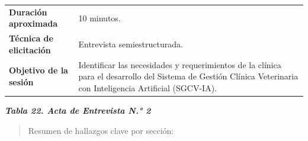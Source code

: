 \documentclass[
]{article}
\begin{document}
{\begin{longtable}[]{|
  >{\raggedright\arraybackslash}p{}|
  >{\raggedright\arraybackslash}p{}|}
\begin{minipage}[t]{\linewidth}
\end{minipage} \\
\hline
\textbf{Duración} \textbf{aproximada} & \begin{minipage}[t]{\linewidth}\raggedright
10 minutos.
\end{minipage} \\
\hline
\textbf{Técnica de} \textbf{elicitación} & \begin{minipage}[t]{\linewidth}\raggedright
Entrevista semiestructurada.
\end{minipage} \\
\hline
\textbf{Objetivo de la} \textbf{sesión} & \begin{minipage}[t]{\linewidth}\raggedright
Identificar las necesidades y requerimientos de la clínica para el
desarrollo del Sistema de Gestión Clínica Veterinaria con Inteligencia Artificial (SGCV-IA).
\end{minipage} \\
\hline
\end{longtable}
}

\protect{}\label{_bookmark81}{}\emph{\textbf{Tabla 22. Acta
de Entrevista N.° 2}}

\begin{quote}
Resumen de hallazgos clave por sección:
\end{quote}
\end{document}
